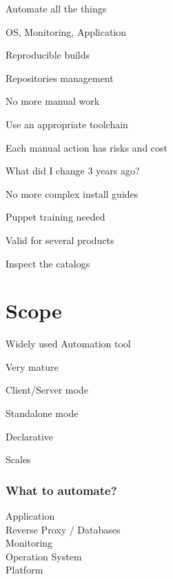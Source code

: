 \begin{iframe}[Automation]
\item Automate all the things
\item OS, Monitoring, Application
\item Reproducible builds
\item Repositories management
\end{iframe}

\begin{iframe}
\item No more manual work
\item Use an appropriate toolchain
\item Each manual action has risks and cost
\item What did I change 3 years ago?
\end{iframe}

\begin{iframe}
\item No more complex install guides
\item Puppet training needed
\item Valid for several products
\item Inspect the catalogs
\end{iframe}

\section{Scope}

\begin{iframe}[Puppet]
\item Widely used Automation tool\pause
\item Very mature\pause
\item Client/Server mode\pause
\item Standalone mode\pause
\item Declarative\pause
\item Scales
\end{iframe}

\begin{frame}
    \frametitle{What to automate?}
    \huge
    Application\\
    Reverse Proxy / Databases\\
    Monitoring\\
    Operation System\\
    Platform
\end{frame}

